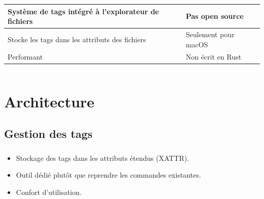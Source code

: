 \documentclass[10pt]{beamer}
\begin{document}
\begin{frame}
\begin{columns}[T]
\begin{column}{.6\textwidth}
\begin{center}
\begin{tabularx}{6cm}{|X|X|}
                    Système de tags intégré à l'explorateur de fichiers & Pas open source \\ \hline
                    Stocke les tags dans les attributs des fichiers & Seulement pour macOS \\ \hline
                    Performant & Non écrit en Rust \\ \hline
                \end{tabularx}
            \end{center}
        \end{column}
    \end{columns}
\end{frame}

\section{Architecture}
\subsection{Gestion des tags}
\begin{frame}
    \frametitle{\subsecname}
    \begin{itemize}
        \item Stockage des tags dans les attributs étendus (XATTR).
        \item Outil dédié plutôt que reprendre les commandes existantes.
        \item Confort d'utilisation.
    \end{itemize}
\end{frame}
\end{document}
